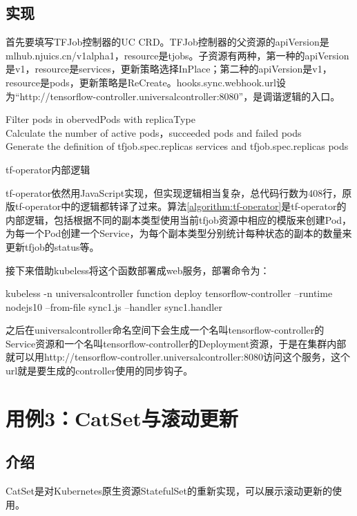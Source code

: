 \documentclass[macfonts,master]{njuthesis}
\begin{document}
\subsection{实现}

首先要填写TFJob控制器的UC CRD。TFJob控制器的父资源的apiVersion是mlhub.njuics.cn/v1alpha1，resource是tjobs。子资源有两种，第一种的apiVersion是v1，resource是services，更新策略选择InPlace；第二种的apiVersion是v1，resource是pods，更新策略是ReCreate。hooks.sync.webhook.url设为``http://tensorflow-controller.universalcontroller:8080''，是调谐逻辑的入口。


\begin{algorithm}[H]
\small
\DontPrintSemicolon
  {
  	Filter pods in obervedPods with replicaType\\
  	Calculate the number of active pods，succeeded pods and failed pods\\
  	Generate the definition of tfjob.spec.replicas services and tfjob.spec.replicas pods
  }
\caption{tf-operator内部逻辑}
\label{algorithm:tf-operator}
\end{algorithm}


tf-operator依然用JavaScript实现，但实现逻辑相当复杂，总代码行数为408行，原版tf-operator中的逻辑都转译了过来。算法\ref{algorithm:tf-operator}是tf-operator的内部逻辑，包括根据不同的副本类型使用当前tfjob资源中相应的模版来创建Pod，为每一个Pod创建一个Service，为每个副本类型分别统计每种状态的副本的数量来更新tfjob的status等。

接下来借助kubeless将这个函数部署成web服务，部署命令为：

kubeless -n universalcontroller function deploy tensorflow-controller --runtime nodejs10 --from-file sync1.js --handler sync1.handler

之后在universalcontroller命名空间下会生成一个名叫tensorflow-controller的Service资源和一个名叫tensorflow-controller的Deployment资源，于是在集群内部就可以用http://tensorflow-controller.universalcontroller:8080访问这个服务，这个url就是要生成的controller使用的同步钩子。

\section{用例3：CatSet与滚动更新}\label{section:catset}
\subsection{介绍}
CatSet是对Kubernetes原生资源StatefulSet的重新实现，可以展示滚动更新的使用。
\end{document}
